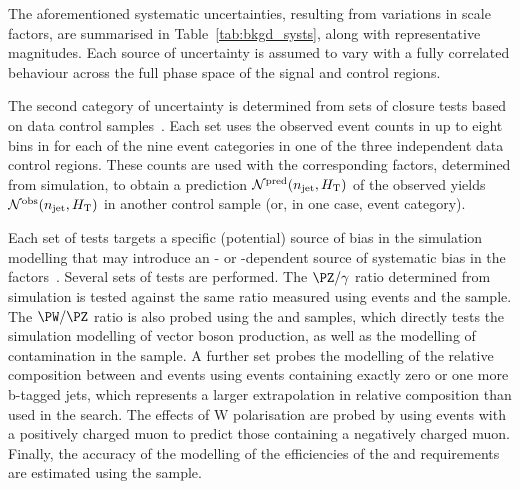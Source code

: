 The aforementioned systematic uncertainties, resulting from variations
in scale factors, are summarised in Table~\ref{tab:bkgd_systs}, along
with representative magnitudes.  Each source of uncertainty is assumed
to vary with a fully correlated behaviour across the full phase space
of the signal and control regions.

The second category of uncertainty is determined from sets of closure
tests based on data control samples~\cite{RA1Paper2012}. Each set uses
the observed event counts in up to eight bins in \scalht for each of
the nine \njet event categories in one of the three independent data
control regions. These counts are used with the corresponding \tf
factors, determined from simulation, to obtain a prediction
$\mathcal{N}^\text{pred}(n_{\text{jet}}, H_{\mathrm{T}})$ of the observed yields
$\mathcal{N}^\text{obs}(n_{\text{jet}}, H_{\mathrm{T}})$ in another control sample
(or, in one case, \nb event category).

Each set of tests targets a specific (potential) source of bias in the
simulation modelling that may introduce an \njet- or \scalht-dependent
source of systematic bias in the \tf factors~\cite{RA1Paper2012}. Several
sets of tests are performed. The $\PZ/\gamma$ ratio determined from
simulation is tested against the same ratio measured using \zmumuj
events and the \gj sample.
The $\PW/\PZ$ ratio is also probed using the \mj and \mmj
samples, which directly tests the simulation modelling of vector
boson production, as well as the modelling of \ttbar contamination in
the \mj sample. 
A further set probes the modelling of the relative composition between
\wlj and \ttbar events using \mj events containing exactly zero or one
more b-tagged jets, which represents a larger extrapolation in
relative composition than used in the search.  The effects of W
polarisation are probed by using \mj events with a positively charged
muon to predict those containing a negatively charged muon. Finally,
the accuracy of the modelling of the efficiencies of the \alphat and
\bdphi requirements are estimated using the \mj sample.


